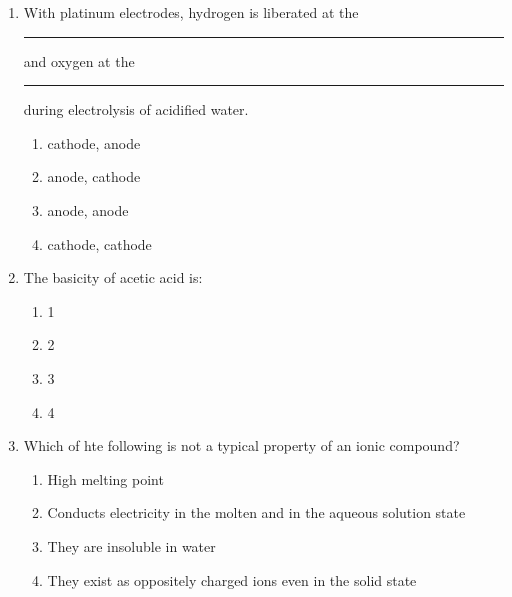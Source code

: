 \begin{enumerate}[label=(\roman*)]

    \item With platinum electrodes, hydrogen is liberated at the \rule{1.5cm}{0.15mm} 
        and oxygen at the \rule{1.5cm}{0.15mm} during electrolysis of acidified 
        water.

        \begin{multicols}{2}
        \begin{enumerate}[label=(\alph*)]
            \setlength\itemsep{0em}
            \item cathode, anode
            \item anode, cathode
            \item anode, anode
            \item cathode, cathode
        \end{enumerate}
        \end{multicols}

    \item The basicity of acetic acid is:

        \begin{multicols}{4}
        \begin{enumerate}[label=(\alph*)]
            \setlength\itemsep{0em}
            \item 1
            \item 2
            \item 3
            \item 4
        \end{enumerate}
        \end{multicols}

    \item Which of hte following is not a typical property of an ionic compound?

        \begin{enumerate}[label=(\alph*)]
            \setlength\itemsep{0em}
            \item High melting point
            \item Conducts electricity in the molten and in the aqueous solution state
            \item They are insoluble in water
            \item They exist as oppositely charged ions even in the solid state
        \end{enumerate}


\end{enumerate}
